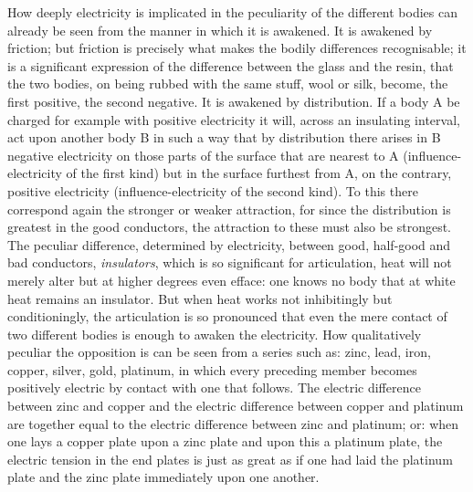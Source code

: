 \documentclass[12pt,a4paper]{book}
\begin{document}
How deeply electricity is implicated in the peculiarity of the different
bodies can already be seen from the manner in which it is awakened. It is awakened by friction; but friction is precisely
what makes the bodily differences recognisable; it is a significant expression of the difference between the glass and
the resin, that the two bodies, on being rubbed with the same stuff, wool or silk, become, the first positive, the second
negative. It is awakened by distribution.
If a body A be charged for example with positive electricity it will, across an insulating interval, act upon another body
B in such a way that by distribution there arises in B negative electricity on those parts of the surface that are nearest
to A (influence-electricity of the first kind) but in the surface furthest from A, on the contrary, positive electricity
(influence-electricity of the second kind). To this there correspond again the stronger or weaker attraction, for since
the distribution is greatest in the good conductors, the attraction to these must also be strongest. The peculiar
difference, determined by electricity, between good, half-good and bad conductors,
\emph{insulators}, which is so significant for articulation, heat will not merely alter but at higher degrees even
efface: one knows no body that at white heat remains an insulator. But when heat works not inhibitingly but
conditioningly, the articulation is so pronounced that even the mere contact of two different bodies is enough to awaken
the electricity. How qualitatively peculiar the opposition is can be seen from a series such as: zinc, lead, iron,
copper, silver, gold, platinum, in which every preceding member becomes positively electric by contact with one that
follows. The electric difference between zinc and copper and the electric difference between copper and platinum are
together equal to the electric difference between zinc and platinum; or: when one lays a copper plate upon a zinc plate
and upon this a platinum plate, the electric tension in the end plates is just as great as if one had laid the platinum
plate and the zinc plate immediately upon one another.
\end{document}
